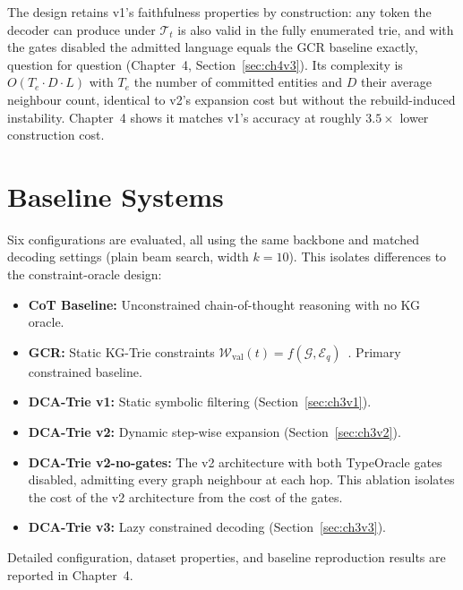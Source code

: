 The design retains v1's faithfulness properties by construction: any token the decoder can produce under $\mathcal{T}_t$ is also valid in the fully enumerated trie, and with the gates disabled the admitted language equals the GCR baseline exactly, question for question (Chapter~4, Section~\ref{sec:ch4v3}). Its complexity is $O(T_e \cdot D \cdot L)$ with $T_e$ the number of committed entities and $D$ their average neighbour count, identical to v2's expansion cost but without the rebuild-induced instability. Chapter~4 shows it matches v1's accuracy at roughly $3.5\times$ lower construction cost.

\section{Baseline Systems}
\label{sec:ch3baseline}

Six configurations are evaluated, all using the same \modelname{} backbone and matched decoding settings (plain beam search, width $k{=}10$). This isolates differences to the constraint-oracle design:

\begin{itemize}
  \item \textbf{CoT Baseline:} Unconstrained chain-of-thought reasoning with no KG oracle.
  \item \textbf{GCR:} Static KG-Trie constraints $\mathcal{W}_{\text{val}}(t)=f(\mathcal{G},\mathcal{E}_q)$~\citep{luo2025-graph-constrained-reasoning}. Primary constrained baseline.
  \item \textbf{DCA-Trie v1:} Static symbolic filtering (Section~\ref{sec:ch3v1}).
  \item \textbf{DCA-Trie v2:} Dynamic step-wise expansion (Section~\ref{sec:ch3v2}).
  \item \textbf{DCA-Trie v2-no-gates:} The v2 architecture with both TypeOracle gates disabled, admitting every graph neighbour at each hop. This ablation isolates the cost of the v2 architecture from the cost of the gates.
  \item \textbf{DCA-Trie v3:} Lazy constrained decoding (Section~\ref{sec:ch3v3}).
\end{itemize}

Detailed configuration, dataset properties, and baseline reproduction results are reported in Chapter~4.

